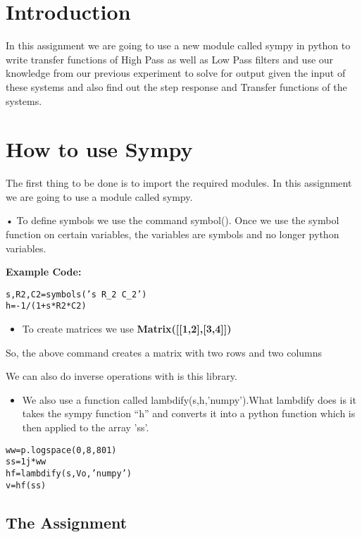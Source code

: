 \documentclass[10pt,english, openany]{book}
\begin{document}
\chapter{Introduction}

In this assignment we are going to use a new module called sympy in python to write transfer functions of High Pass as well as Low Pass filters and use our knowledge from our previous experiment to solve for output given the input of these systems and also find out the step response and Transfer functions of the systems.

\endgroup
\chapter{How to use Sympy}
The first thing to be done is to import the required modules. In this assignment we are going to use a module called sympy.\par
• To define symbols we use the command symbol().
Once we use the symbol function on certain variables, the variables are symbols and no longer python variables.\par
\large\textbf{Example Code:}
\begin{verbatim}
s,R2,C2=symbols(’s R_2 C_2’) 
h=-1/(1+s*R2*C2)
\end{verbatim}
\begin{itemize}
\item To create matrices we use \textbf{Matrix([[1,2],[3,4]])}
\end{itemize}
So, the above command creates a matrix with two rows and two columns\par
We can also do inverse operations with is this library.\par
\begin{itemize}
\item We also use a function called lambdify(s,h,’numpy’).What lambdify does is it takes the sympy function “h” and converts it into a python function which is then applied to the array ’ss’.
\end{itemize}

\begin{verbatim}
ww=p.logspace(0,8,801) 
ss=1j*ww
hf=lambdify(s,Vo,’numpy’) 
v=hf(ss)
\end{verbatim}


\section{The Assignment}
\end{document}
